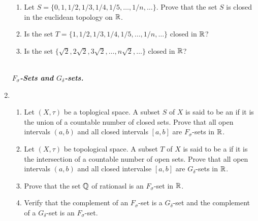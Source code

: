 \documentclass[10pt,a4paper]{report}
\newcommand{\SPECIAL}[1]{\begin{center}
	{\Large \textbf{\textit{\\#1}} }
\end{center}
}
\begin{document}
\begin{enumerate}
\begin{enumerate}[label=(\roman*)]
	\item Let $S=\{0,1,1/2,1/3,1/4,1/5, \dots, 1/n, \dots\}$.  Prove that the set $S$ is closed in the euclidean topology on $\mathbb{R}$.
	
	\item Is the set $T=\{1,1/2,1/3,1/4,1/5,\dots,1/n, \dots\}$ closed in $\mathbb{R}$?
	
	\item Is the set $\{\sqrt{2}, 2\sqrt{2},3\sqrt{2},\dots, n\sqrt{2}, \dots\}$ closed in $\mathbb{R}$?

\end{enumerate}
	
	\SPECIAL{$F_\sigma$-Sets and $G_\delta$-sets.}

\item \begin{enumerate}[label=(\roman*)]

	\item Let $(X, \tau)$ be a toplogical space.  A subset $S$ of $X$ is said to be an  if it is the union of a countable number of closed sets. Prove that all open intervals $(a,b)$ and all closed intervals $[a,b]$ are $F_\sigma$-sets in $\mathbb{R}$.
	
	\item Let $(X, \tau)$ be topological space.  A subset $T$ of $X$ is said to be a  if it is the intersection of a countable number of open sets.  Prove that all open intervals $(a,b)$ and all closed intervalse $[a,b]$ are $G_\delta$-sets in $\mathbb{R}$.
	
	\item Prove that the set $\mathbb{Q}$ of rationasl is an $F_\sigma$-set in $\mathbb{R}$.  
	
	\item Verify that the complement of an $F_\sigma$-set is a $G_\delta$-set and the complement of a $G_\delta$-set is an $F_\sigma$-set.

\end{enumerate}

\end{enumerate}  %
\end{document}

